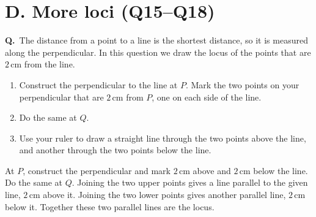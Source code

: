 \documentclass[12pt,a4paper]{article}
\newcounter{sol}
\newcommand{\s}{\refstepcounter{sol}\textbf{Q\thesol.}\ }
\newcommand{\pt}[3]{\fill #1 circle (1.5pt); \node[inner sep=2pt,#2] at #1 {$#3$};}
\begin{document}
\newpage

\section*{D. More loci (Q15--Q18)}

\s The distance from a point to a line is the shortest distance, so it is measured along the perpendicular. In this question we draw the locus of the points that are \(2\)\,cm from the line.
\begin{enumerate}
  \item Construct the perpendicular to the line at \(P\). Mark the two points on your perpendicular that are \(2\)\,cm from \(P\), one on each side of the line.
  \item Do the same at \(Q\).
  \item Use your ruler to draw a straight line through the two points above the line, and another through the two points below the line.
\end{enumerate}

\begin{solbox}
At \(P\), construct the perpendicular and mark \(2\)\,cm above and \(2\)\,cm below the line. Do the same at \(Q\). Joining the two upper points gives a line parallel to the given line, \(2\)\,cm above it. Joining the two lower points gives another parallel line, \(2\)\,cm below it. Together these two parallel lines are the locus.
\end{solbox}

\begin{center}
\end{center}
\end{document}
